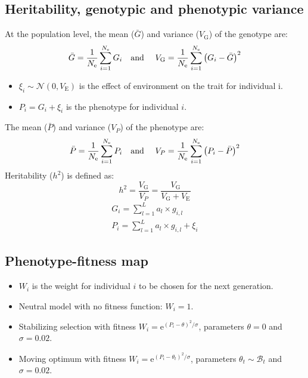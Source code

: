 \documentclass{article}
\newcommand{\e}{\text{e}}
\newcommand{\Ne}{N_{\text{e}}}
\newcommand{\Trait}{P}
\newcommand{\NbrLoci}{L}
\newcommand{\VarPhenotype}{V_{\Trait}}
\newcommand{\VarGenetic}{V_{\mathrm{G}}}
\newcommand{\VarEnv}{V_{\mathrm{E}}}
\begin{document}
\subsection{Heritability, genotypic and phenotypic variance}
At the population level, the mean ($\bar{G}$) and variance ($\VarGenetic$) of the genotype are:
\begin{equation}
    \bar{G} = \frac{1}{\Ne}\sum_{i=1}^{\Ne} G_i  \text{\quad and \quad}	\VarGenetic = \frac{1}{\Ne}\sum_{i=1}^{\Ne}\left(G_i - \bar{G} \right)^2
\end{equation}
\begin{itemize}
    \setlength\itemsep{-0.2em}
    \item $\xi_i \sim \mathcal{N}(0, \VarEnv)$ is the effect of environment on the trait for individual i.
    \item $\Trait_i = G_i + \xi_i$ is the phenotype for individual $i$.
\end{itemize}
The mean ($\bar{\Trait}$) and variance ($\VarPhenotype$) of the phenotype are:
\begin{equation}
    \bar{\Trait} = \frac{1}{\Ne}\sum_{i=1}^{\Ne} \Trait_i \text{\quad and \quad} \VarPhenotype = \frac{1}{\Ne}\sum_{i=1}^{\Ne}\left(\Trait_i - \bar{\Trait} \right)^2
\end{equation}
Heritability ($h^2$) is defined as:
\begin{equation}
    h^2 = \frac{\VarGenetic}{\VarPhenotype} = \frac{\VarGenetic}{\VarGenetic + \VarEnv}
\end{equation}
\begin{gather}
    G_i = \sum_{l=1}^{\NbrLoci} a_l \times g_{i,l} \\
    \Trait_i = \sum_{l=1}^{\NbrLoci} a_l \times g_{i,l} + \xi_i
\end{gather}

\subsection{Phenotype-fitness map}

\begin{itemize}
    \item $W_i$ is the weight for individual $i$ to be chosen for the next generation.
    \item Neutral model with no fitness function: $W_i = 1$.
    \item Stabilizing selection with fitness $W_i = \e^{(\Trait_i - \theta)^2/ \sigma}$, parameters $\theta=0$ and $\sigma=0.02$.
    \item Moving optimum with fitness $W_i = \e^{(\Trait_i - \theta_t)^2/ \sigma}$, parameters $\theta_t \sim \mathcal{B}_t$ and $\sigma=0.02$.
\end{itemize}
\end{document}
